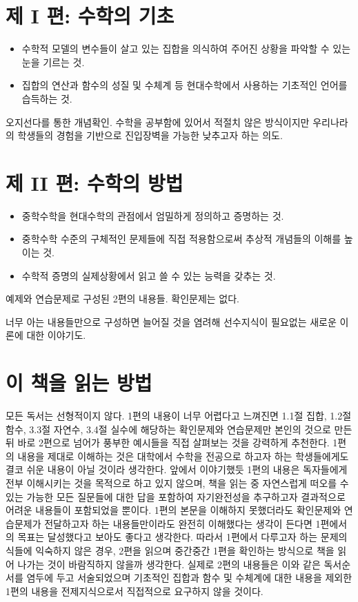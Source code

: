 \documentclass{../../large}
\begin{document}
\section*{제 I 편: 수학의 기초}

\begin{itemize}
\item 수학적 모델의 변수들이 살고 있는 집합을 의식하여 주어진 상황을 파악할 수 있는 눈을 기르는 것.
\item 집합의 연산과 함수의 성질 및 수체계 등 현대수학에서 사용하는 기초적인 언어를 습득하는 것.
\end{itemize}


오지선다를 통한 개념확인. 수학을 공부함에 있어서 적절치 않은 방식이지만 우리나라의 학생들의 경험을 기반으로 진입장벽을 가능한 낮추고자 하는 의도.


\section*{제 II 편: 수학의 방법}

\begin{itemize}
\item 중학수학을 현대수학의 관점에서 엄밀하게 정의하고 증명하는 것.
\item 중학수학 수준의 구체적인 문제들에 직접 적용함으로써 추상적 개념들의 이해를 높이는 것.
\item 수학적 증명의 실제상황에서 읽고 쓸 수 있는 능력을 갖추는 것.
\end{itemize}

예제와 연습문제로 구성된 2편의 내용들. 확인문제는 없다.

너무 아는 내용들만으로 구성하면 늘어질 것을 염려해 선수지식이 필요없는 새로운 이론에 대한 이야기도.


\section*{이 책을 읽는 방법}

모든 독서는 선형적이지 않다.
1편의 내용이 너무 어렵다고 느껴진면 1.1절 집합, 1.2절 함수, 3.3절 자연수, 3.4절 실수에 해당하는 확인문제와 연습문제만 본인의 것으로 만든 뒤 바로 2편으로 넘어가 풍부한 예시들을 직접 살펴보는 것을 강력하게 추천한다.
1편의 내용을 제대로 이해하는 것은 대학에서 수학을 전공으로 하고자 하는 학생들에게도 결코 쉬운 내용이 아닐 것이라 생각한다.
앞에서 이야기했듯 1편의 내용은 독자들에게 전부 이해시키는 것을 목적으로 하고 있지 않으며, 책을 읽는 중 자연스럽게 떠오를 수 있는 가능한 모든 질문들에 대한 답을 포함하여 자기완전성을 추구하고자 결과적으로 어려운 내용들이 포함되었을 뿐이다.
1편의 본문을 이해하지 못했더라도 확인문제와 연습문제가 전달하고자 하는 내용들만이라도 완전히 이해했다는 생각이 든다면 1편에서의 목표는 달성했다고 보아도 좋다고 생각한다.
따라서 1편에서 다루고자 하는 문제의식들에 익숙하지 않은 경우, 2편을 읽으며 중간중간 1편을 확인하는 방식으로 책을 읽어 나가는 것이 바람직하지 않을까 생각한다.
실제로 2편의 내용들은 이와 같은 독서순서를 염두에 두고 서술되었으며 기초적인 집합과 함수 및 수체계에 대한 내용을 제외한 1편의 내용을 전제지식으로서 직접적으로 요구하지 않을 것이다.
\end{document}
